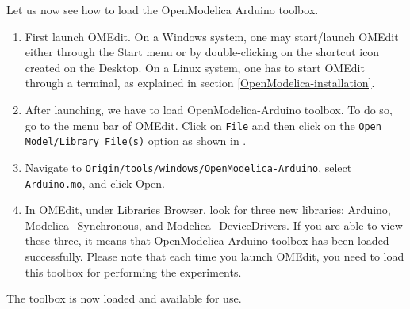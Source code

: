 Let us now see how to load the OpenModelica Arduino toolbox. 
\begin{enumerate}
      \item First launch OMEdit. On a Windows system, one may start/launch
            OMEdit either through the Start menu or by double-clicking on the
            shortcut icon created on the Desktop. On a Linux system, one has to
            start OMEdit through a terminal, as
            explained in section \ref{OpenModelica-installation}.
      \item After launching, we have to load OpenModelica-Arduino 
            toolbox. To do so, go to the menu bar of OMEdit. 
            Click on {\tt File} and then click on
            the {\tt Open Model/Library File(s)} option as shown in .
      \item Navigate to {\tt Origin/tools/windows/OpenModelica-Arduino}, select \\ {\tt Arduino.mo}, 
            and click Open. 
      \item In OMEdit, under Libraries Browser, look for three new libraries: Arduino, 
      Modelica\_Synchronous, and Modelica\_DeviceDrivers. If you are able to view these three,
      it means that OpenModelica-Arduino toolbox has been loaded successfully. 
      Please note that each time you launch OMEdit, you need to load this toolbox for
      performing the experiments. 
\end{enumerate}
The toolbox is now loaded and available for use.




